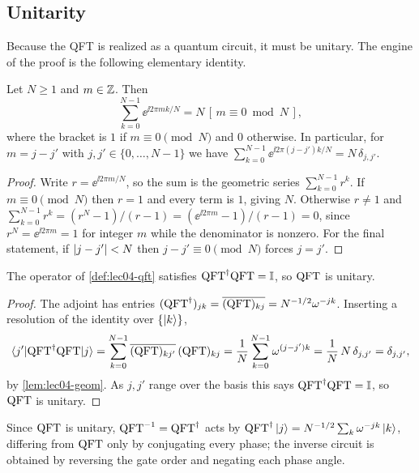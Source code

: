 \subsection*{Unitarity}

Because the QFT is realized as a quantum circuit, it must be unitary. The engine
of the proof is the following elementary identity.

\begin{lemma}
\label{lem:lec04-geom}
Let $N\ge1$ and $m\in\mathbb{Z}$. Then
\[
  \sum_{k=0}^{N-1}\ee^{\ii 2\pi mk/N}=N\,[\,m\equiv 0\bmod N\,],
\]
where the bracket is $1$ if $m\equiv0\pmod N$ and $0$ otherwise. In particular,
for $m=j-j'$ with $j,j'\in\{0,\dots,N-1\}$ we have
$\sum_{k=0}^{N-1}\ee^{\ii 2\pi(j-j')k/N}=N\,\delta_{j,j'}$.
\end{lemma}

\begin{proof}
Write $r=\ee^{\ii 2\pi m/N}$, so the sum is the geometric series
$\sum_{k=0}^{N-1}r^{k}$. If $m\equiv0\pmod N$ then $r=1$ and every term is $1$,
giving $N$. Otherwise $r\neq1$ and
$\sum_{k=0}^{N-1}r^{k}=(r^{N}-1)/(r-1)=(\ee^{\ii 2\pi m}-1)/(r-1)=0$, since
$r^{N}=\ee^{\ii 2\pi m}=1$ for integer $m$ while the denominator is nonzero. For
the final statement, if $\left\lvert j-j' \right\rvert<N$ then $j-j'\equiv0\pmod N$ forces $j=j'$.
\end{proof}

\begin{theorem}
\label{thm:lec04-unitary}
The operator of \cref{def:lec04-qft} satisfies $\mathrm{QFT}^{\dagger}\mathrm{QFT}=\mathbb{I}$, so $\mathrm{QFT}$ is
unitary.
\end{theorem}

\begin{proof}
The adjoint has entries $(\mathrm{QFT}^{\dagger})_{jk}=\overline{(\mathrm{QFT})_{kj}}
=N^{-1/2}\omega^{-jk}$. Inserting a resolution of the identity over
$\{\ket{k}\}$,
\[
  \braket{j'|\mathrm{QFT}^{\dagger}\mathrm{QFT}|j}
   =\sum_{k=0}^{N-1}\overline{(\mathrm{QFT})_{kj'}}\,(\mathrm{QFT})_{kj}
   =\frac{1}{N}\sum_{k=0}^{N-1}\omega^{(j-j')k}
   =\frac{1}{N}\,N\,\delta_{j,j'}=\delta_{j,j'},
\]
by \cref{lem:lec04-geom}. As $j,j'$ range over the basis this says
$\mathrm{QFT}^{\dagger}\mathrm{QFT}=\mathbb{I}$, so $\mathrm{QFT}$ is unitary.
\end{proof}

Since $\mathrm{QFT}$ is unitary, $\mathrm{QFT}^{-1}=\mathrm{QFT}^{\dagger}$ acts by
$\mathrm{QFT}^{\dagger}\ket{j}=N^{-1/2}\sum_k\omega^{-jk}\ket{k}$, differing from $\mathrm{QFT}$ only by
conjugating every phase; the inverse circuit is obtained by reversing the gate
order and negating each phase angle.


